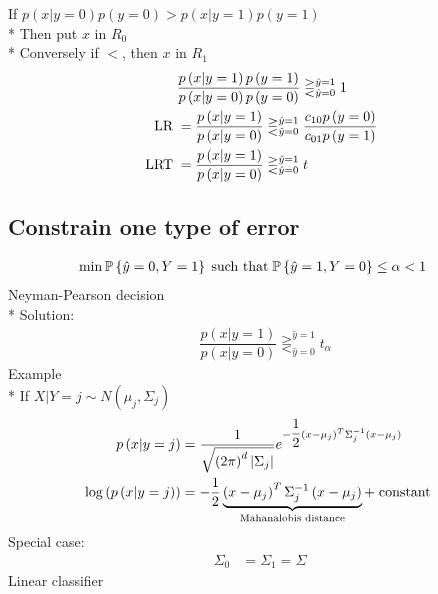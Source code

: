 \documentclass{article}
\begin{document}
If $p\left(x | y = 0\right)  p\left(y = 0\right) > p\left(x | y = 1\right) p\left(y = 1\right)$
\\* Then put $x $ in $R_{0}$
\\* Conversely if $<$, then $x $ in $R_{1}$
\begin{align*}
&  \dfrac{p\left(x | y = 1\right) p\left(y = 1\right)}{p\left(x | y = 0\right) p\left(y = 0\right)} \gtreqless^{\hat{y} = 1}_{\hat{y} = 0} 1
\\ \text{\;LR\;} &= \dfrac{p\left(x | y = 1\right)}{p\left(x | y = 0\right)} \gtreqless^{\hat{y} = 1}_{\hat{y} = 0} \dfrac{c_{10} p\left(y = 0\right)}{c_{01} p\left(y = 1\right)}
\\ \text{\;LRT\;} &= \dfrac{p\left(x | y = 1\right)}{p\left(x | y = 0\right)} \gtreqless^{\hat{y} = 1}_{\hat{y} = 0} t 
\end{align*}


\subsection{Constrain one type of error}

\begin{align*}
\displaystyle\min \mathbb{P}\left\{\hat{y} = 0, Y = 1\right\} \text{\;such that\;} \mathbb{P}\left\{\hat{y} = 1, Y = 0\right\} &\leq  \alpha < 1
\end{align*}
Neyman-Pearson decision
\\* Solution:
\begin{align*}
&\dfrac{p\left(x | y = 1\right)}{p\left(x | y = 0\right)} \gtreqless^{\hat{y} = 1}_{\hat{y} = 0} t_{\alpha}
\end{align*}
Example
\\* If $X  | Y = j \sim  N\left(\mu_{j}, \Sigma_{j}\right)$
\begin{align*}
p\left(x | y = j\right)  &= \dfrac{1}{\sqrt{\left(2 \pi\right)^{d} | \Sigma_{j} |}} e^{- \dfrac{1}{2} \left(x - \mu_{j}\right)^{T} \Sigma^{-1}_{j} \left(x - \mu_{j}\right)}
\\ \log\left(p\left(x | y = j\right)\right) &= - \dfrac{1}{2} \underbrace{\left(x - \mu_{j}\right)^{T} \Sigma^{-1}_{j} \left(x - \mu_{j}\right)}_{\text{\;Mahanalobis distance\;}} + \text{\;constant\;}
\end{align*}
Special case:
\begin{align*}
\Sigma_{0} &= \Sigma_{1} = \Sigma
\end{align*}
Linear classifier
\end{document}
